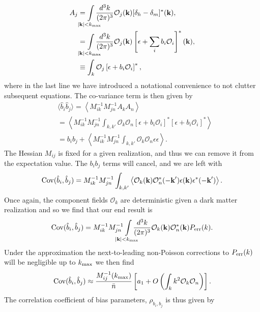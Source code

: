 \documentclass[fleqn,usenatbib]{mnras}
\newcommand{\bk}{\textbf{k}}
\newcommand{\kmax}{k_{\rm max}}
\begin{document}
\begin{align}
    A_j &= \int\limits_{\mathclap{|\bk| < k_{\rm max}}} \frac{d^3k}{(2\pi)^3} \mathcal{O}_j (\bk) [\delta_h - \delta_m]^*(\bk), \\
    &= \int\limits_{\mathclap{|\bk| < k_{\rm max}}} \frac{d^3k}{(2\pi)^3} \mathcal{O}_j (\bk) \left [ \epsilon + \sum_i b_i \mathcal{O}_i \right ]^*(\bk),\\
    &\equiv \int_k \mathcal{O}_j  \left [ \epsilon + b_i\mathcal{O}_i \right ]^*,
\end{align}
where in the last line we have introduced a notational convenience to not clutter subsequent equations. The co-variance term is then given by
\begin{align}
&\langle \hat{b}_i \hat{b}_j \rangle = \left \langle M_{ik}^{-1}M_{jn}^{-1}A_k A_n \right \rangle \\
&= \left \langle M_{ik}^{-1}M_{jn}^{-1} \int_{k, k'} \mathcal{O}_k\mathcal{O}_n  \left [ \epsilon + b_i\mathcal{O}_i \right ]^*  \left [ \epsilon + b_i\mathcal{O}_i \right ]^* \right \rangle \\
&= b_i b_j + \left \langle M_{ik}^{-1}M_{jn}^{-1} \int_{k, k'} \mathcal{O}_k\mathcal{O}_n \epsilon \epsilon \right \rangle.
\end{align}
The Hessian $M_{ij}$ is fixed for a given realization, and thus we can remove it from the expectation value. The $b_i b_j$ terms will cancel, and we are left with
\begin{align}
 {\rm Cov}(\hat{b}_i,\hat{b}_j) = M_{ik}^{-1}M_{jn}^{-1} \int_{k,k'} \left \langle \mathcal{O}_k (\bk) \mathcal{O}_n^* (-\bk') \epsilon(\bk) \epsilon^* (-\bk') \right \rangle.
\end{align}
Once again, the component fields $\mathcal{O}_k$ are deterministic given a dark matter realization and so we find that our end result is 
\begin{align}
 {\rm Cov}(\hat{b}_i,\hat{b}_j) = M_{ik}^{-1}M_{jn}^{-1} \int\limits_{\mathclap{|\bk| < k_{\rm max}}} \frac{d^3k}{(2\pi)^3} \mathcal{O}_k (\bk) \mathcal{O}_n^* (\bk) P_{\rm err}(k).
\end{align}
Under the approximation the next-to-leading non-Poisson corrections to $P_{\rm err}(k)$ will be negligible up to $k_{\rm max}$ we then find
\begin{align}
 {\rm Cov}(\hat{b}_i,\hat{b}_j) \approx \frac{M_{ij}^{-1} (\kmax)}{\bar{n}} \left [ a_1 +  O \left (\int_k k^2 \mathcal{O}_k \mathcal{O}_n \right )\right  ].
\end{align}
The correlation coefficient of bias parameters, $\rho_{b_i,b_j}$ is thus given by
\end{document}
